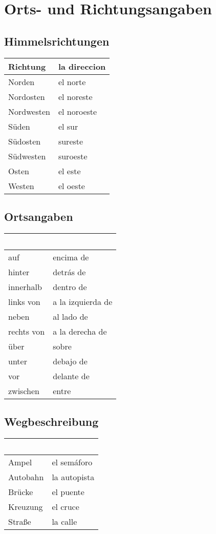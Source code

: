 \documentclass{spanish_summary}
\begin{document}
  \chapter*{Orts- und Richtungsangaben}
  \section*{Himmelsrichtungen}
  \begin{longtable}{p{} | p{}} 
    \textbf{Richtung}     & \textbf{la direccion}                                       \\ \hline
    Norden & el norte \\
    Nordosten & el noreste \\
    Nordwesten & el noroeste \\
    Süden & el sur \\
    Südosten & sureste \\
    Südwesten & suroeste \\
    Osten & el este \\
    Westen & el oeste \\
  \end{longtable}
  
  \section*{Ortsangaben}
  \begin{longtable}{p{} | p{}} 
    \textbf{~}     & \textbf{~}                                       \\ \hline
    auf & encima de \\
    hinter & detrás de \\
    innerhalb & dentro de \\
    links von & a la izquierda de \\
    neben & al lado de \\
    rechts von & a la derecha de\\
    über & sobre \\
    unter & debajo de \\
    vor & delante de \\
    zwischen & entre \\    
  \end{longtable}
  
  \section*{Wegbeschreibung}
  \begin{longtable}{p{} | p{}} 
    \textbf{~}     & \textbf{~}                                       \\ \hline
    Ampel & el semáforo \\
    Autobahn & la autopista \\
    Brücke & el puente \\
    Kreuzung & el cruce \\
    Straße & la calle \\
  \end{longtable}    
\end{document}
